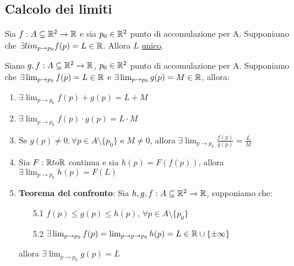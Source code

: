 \subsection{Calcolo dei limiti}
\begin{proposition}
  Sia $f: A \subseteq \mathbb{R}^2 \to \mathbb{R}$ e sia $p_0 \in \mathbb{R}^2$ punto di accomulazione per A. Supponiamo che 
  $\exists lim_{p \to p_0} f(p) = L \in \mathbb{R}$. Allora $L$ \ace \underline{unico}.
\end{proposition}
\begin{theorem}
  Siano $g,f: A \subseteq \mathbb{R}^2 \to \mathbb{R}$, $p_0 \in \mathbb{R}^2$ punto di accomulazione per A. Supponiamo che 
  $\exists \lim_{p\to p_0} f(p) = L \in \mathbb{R}$ e $\exists \lim_{p\to p_0} g(p) = M \in \mathbb{R}$, allora:
  \begin{enumerate}
    \item $\exists \lim_{p\to p_0} f(p) + g(p)= L + M$
    \item $\exists \lim_{p\to p_0} f(p) \cdot g(p)= L \cdot M$
    \item Se $g(p) \not = 0, \forall p \in A\setminus \{p_0\}$ e $M \not = 0$, allora $\exists \lim_{p\to p_0} \frac{f(p)}{g(p)} = \frac{L}{M}$
    \item Sia $F:\mathbb{R} to \mathbb{R}$ continua e sia $h(p) = F(f(p))$, allora $\exists  \lim_{p\to p_0} h(p) = F(L)$
    \item \textbf{Teorema del confronto}: Sia $h,g,f: A \subseteq \mathbb{R}^2 \to \mathbb{R}$, supponiamo che:
          \begin{itemize}
            \item[5.1] $f(p) \leq g(p) \leq h(p)$, $\forall p \in A \setminus \{p_0\}$
            \item[5.2] $\exists\lim_{p \to p_0} f(p) = \lim_{p \to p\to p_0} h(p) = L \in \mathbb{R} \cup \{\pm \infty\}$
          \end{itemize}
          allora $\exists \lim_{p \to p_0} g(p) = L$
  \end{enumerate}
\end{theorem}
